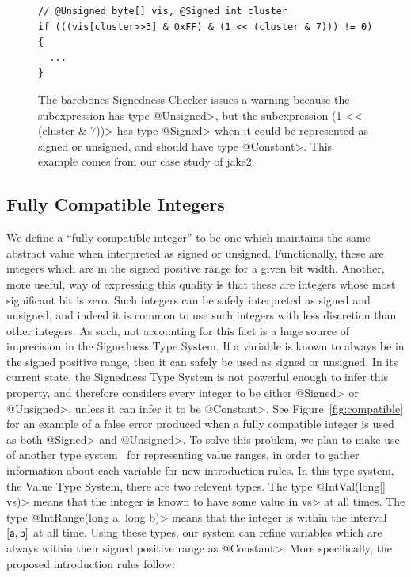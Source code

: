 \begin{figure}[h]
\begin{lstlisting}
// @Unsigned byte[] vis, @Signed int cluster
if (((vis[cluster>>3] & 0xFF) & (1 << (cluster & 7))) != 0)
{
  ...
}
\end{lstlisting}
\vspace{-10pt}
\caption{
  The barebones Signedness Checker issues a warning because the
subexpression  has type
\<@Unsigned>, but the subexpression \<(1 <{}< (cluster & 7))>
has type \<@Signed> when it could be represented
as signed or unsigned, and should have type \<@Constant>.
This example comes from our case study of jake2.
}
\label{fig:shiftpropo}
\end{figure}

\subsection{Fully Compatible Integers}
We define a ``fully compatible integer'' to be one which maintains the same abstract
value when interpreted as signed or unsigned. Functionally, these are integers
which are in the signed positive range for a given bit width. Another, more
useful, way of expressing this quality is that these are integers whose most
significant bit is zero. Such integers can be safely interpreted as signed and
unsigned, and indeed it is common to use such integers with less discretion than
other integers. As such, not accounting for this fact is a huge source of
imprecision in the Signedness Type System. If a variable is known to always be
in the signed positive range, then it can safely be used as signed or unsigned.
In its current state, the Signedness Type System is not powerful enough to
infer this property, and therefore considers every integer to be either \<@Signed>
or \<@Unsigned>, unless it can infer it to be \<@Constant>.
See Figure~\ref{fig:compatible} for
an example of a false error produced when a fully compatible integer is used
as both \<@Signed> and \<@Unsigned>.
To solve this problem, we plan to make use of another
type system~\cite{ValueChecker} for representing value ranges, in order to
gather information about
each variable for new introduction rules.
In this type system, the Value Type System, there are two relevent types. The
type \<@IntVal(long[] vs)> means that the integer is known to have some value in
\<vs> at all times.
The type \<@IntRange(long a, long b)> means that the integer
is within the interval $[\<a>, \<b>]$ at all time.
Using these types, our system can refine variables which are
always within their signed positive range as \<@Constant>.
More specifically, the proposed introduction rules follow:

